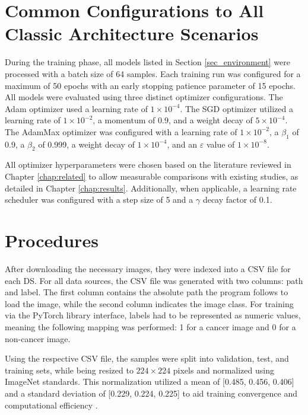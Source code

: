 \section{Common Configurations to All Classic Architecture Scenarios}
\label{sec_config}

During the training phase, all models listed in Section \ref{sec_environment} were processed with a batch size of 64 samples. Each training run was configured for a maximum of 50 epochs with an early stopping patience parameter of 15 epochs. All models were evaluated using three distinct optimizer configurations. The Adam optimizer used a learning rate of $1\times 10^{-4}$. The SGD optimizer utilized a learning rate of $1\times 10^{-2}$, a momentum of 0.9, and a weight decay of $5\times 10^{-4}$. The AdamMax optimizer was configured with a learning rate of $1\times 10^{-2}$, a $\beta_1$ of 0.9, a $\beta_2$ of 0.999, a weight decay of $1\times 10^{-4}$, and an $\varepsilon$ value of $1\times 10^{-8}$.

All optimizer hyperparameters were chosen based on the literature reviewed in Chapter \ref{chap:related} to allow measurable comparisons with existing studies, as detailed in Chapter \ref{chap:results}. Additionally, when applicable, a learning rate scheduler was configured with a step size of 5 and a $\gamma$ decay factor of 0.1.

\section{Procedures}
\label{sec_procediments}
After downloading the necessary images, they were indexed into a \gls{CSV} file for each \gls{DS}. For all data sources, the \gls{CSV} file was generated with two columns: path and label. The first column contains the absolute path the program follows to load the image, while the second column indicates the image class. For training via the PyTorch library interface, labels had to be represented as numeric values, meaning the following mapping was performed: 1 for a cancer image and 0 for a non-cancer image.

Using the respective \gls{CSV} file, the samples were split into validation, test, and training sets, while being resized to $224 \times 224$ pixels and normalized using ImageNet standards. This normalization utilized a mean of [0.485, 0.456, 0.406] and a standard deviation of [0.229, 0.224, 0.225] to aid training convergence and computational efficiency \cite{DBLP:conf/nips/KrizhevskySH12, 10913097}.

